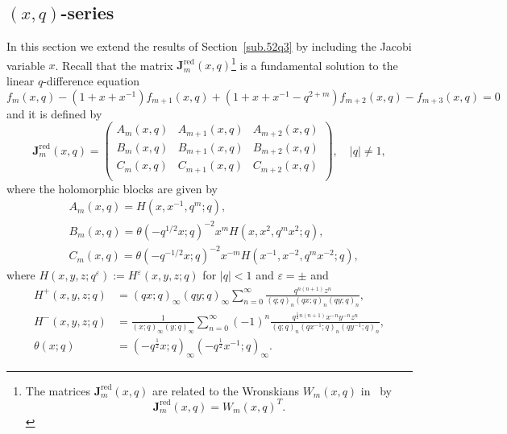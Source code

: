 \documentclass[12pt,reqno]{amsart}
\theoremstyle{definition}
\def\be{\begin{equation}}
\def\ee{\end{equation}}
\def\bJ{\mathbf J}
\def\RED{\mathrm{red}}
\begin{document}
\subsection{$(x,q)$-series}
\label{sub.52qx}

In this section we extend the results of Section~\ref{sub.52q3} by including the
Jacobi variable $x$. Recall that the matrix $\bJ^{\RED}_{m}(x,q)$\footnote{The matrices
  $\bJ^\RED_m(x,q)$ are related to the Wronskians $W_m(x,q)$
  in~\cite{GGM:resurgent,GGM:peacock} by
  \begin{equation}
    \bJ^\RED_m(x,q) = W_m(x,q)^T.
  \end{equation}}
is a fundamental solution to the linear $q$-difference equation
\be
  f_m(x,q)-(1+x+x^{-1})f_{m+1}(x,q)+(1+x+x^{-1}-q^{2+m})f_{m+2}(x,q) - f_{m+3}(x,q) = 0
\ee
and it is defined by
\begin{equation}
  \label{Jred52x}
  \bJ^\RED_m(x,q) =
  \begin{pmatrix}
    A_m(x,q)&A_{m+1}(x,q)&A_{m+2}(x,q)\\
    B_m(x,q)&B_{m+1}(x,q)&B_{m+2}(x,q)\\
    C_m(x,q)&C_{m+1}(x,q)&C_{m+2}(x,q)\\
  \end{pmatrix},\quad |q|\neq 1,
\end{equation}
where the holomorphic blocks are given by
\begin{subequations}
  \begin{align}
    &A_m(x,q) = H(x,x^{-1},q^m;q),\\
    &B_m(x,q) = \theta(-q^{1/2}x;q)^{-2}x^m H(x,x^2,q^mx^2;q),\\
    &C_m(x,q) = \theta(-q^{-1/2}x;q)^{-2}x^{-m} H(x^{-1},x^{-2},q^mx^{-2};q),
  \end{align}
\end{subequations}
where $H(x,y,z;q^\varepsilon):=H^\varepsilon(x,y,z;q)$ for $|q|<1$ and
$\varepsilon=\pm$ and
\begin{subequations}
  \begin{align}
    H^+(x,y,z;q) &=
      (qx;q)_\infty(qy;q)_\infty\sum_{n=0}^\infty\frac{q^{n(n+1)}z^n}
      {(q;q)_n(qx;q)_n(qy;q)_n},\\
    H^-(x,y,z;q) &= \frac{1}{(x;q)_\infty(y;q)_\infty}\sum_{n=0}^\infty
      (-1)^n\frac{q^{\frac{1}{2}n(n+1)}x^{-n}y^{-n}z^n}
      {(q;q)_n(qx^{-1};q)_n(qy^{-1};q)_n},\\
    \theta(x;q)&=(-q^{\frac{1}{2}}x;q)_{\infty}(-q^{\frac{1}{2}}x^{-1};q)_{\infty}.
  \end{align}
\end{subequations}
\end{document}
